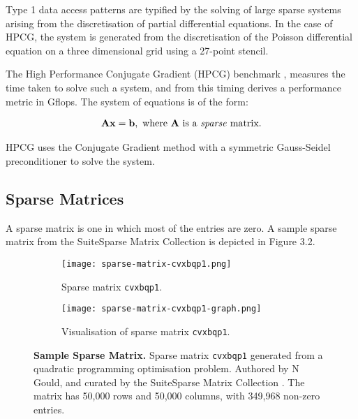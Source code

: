 Type 1 data access patterns are typified by the solving of large sparse systems arising from the discretisation of partial differential equations. In the case of HPCG, the system is generated from the discretisation of the Poisson differential equation on a three dimensional grid using a 27-point stencil. 

The High Performance Conjugate Gradient (HPCG) benchmark \cite{hpcg-benchmark}, measures the time taken to solve such a system, and from this timing derives a performance metric in Gflops. The system of equations is of the form:

\begin{align}
\mathbf{Ax} = \mathbf{b},\text{ where } \mathbf{A} \text{ is a \emph{sparse} matrix}.
\end{align}

HPCG uses the Conjugate Gradient method with a symmetric Gauss-Seidel preconditioner to solve the system.


%
%

\subsection{Sparse Matrices}

A sparse matrix is one in which most of the entries are zero. A sample sparse matrix from the SuiteSparse Matrix Collection \cite{sparsesuite} is depicted in Figure 3.2.  

\begin{figure}[]
	\begin{subfigure}{1.0\textwidth}
		\centering
		\texttt{[image: sparse-matrix-cvxbqp1.png]}
		\caption{Sparse matrix \texttt{cvxbqp1}.}
		\label{fig:subim1}
	\end{subfigure}
	\par\bigskip
	\begin{subfigure}{1.0\textwidth}
		\centering
		\texttt{[image: sparse-matrix-cvxbqp1-graph.png]}
		\caption{Visualisation of sparse matrix \texttt{cvxbqp1}.}
		\label{fig:subim2}
	\end{subfigure}
\caption{\textbf{Sample Sparse Matrix.} Sparse matrix \texttt{cvxbqp1} generated from a quadratic programming optimisation problem. Authored by N Gould, and curated by the SuiteSparse Matrix Collection \cite{sparsesuite}. The matrix has 50,000 rows and 50,000 columns, with 349,968 non-zero entries.}
\label{fig:image2}
\end{figure}

